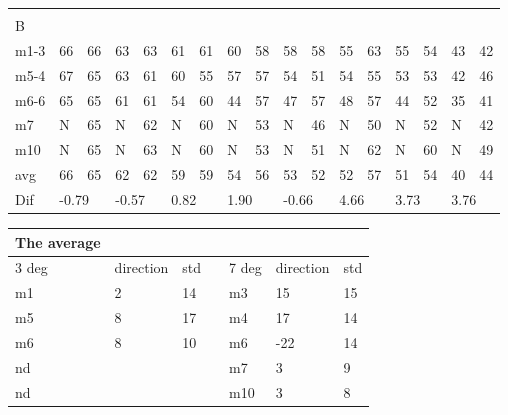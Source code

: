 \begin{table}[H]
\begin{tabular}{l|l|l|l|l|l|l|l|l|l|l|l|l|l|l|l|l}
\multicolumn{17}{l}{ } \\   
B & \multicolumn{2}{l|}{} & \multicolumn{2}{l|}{} & \multicolumn{2}{l|}{} & \multicolumn{2}{l|}{} & \multicolumn{2}{l|}{} & \multicolumn{2}{l|}{}& \multicolumn{2}{l|}{}& \multicolumn{2}{l}{}     \\ \hline
m1-3   &    66    &    66    &   63    &   63       &    61   &   61    &   60     &   58     &    58   &    58     &    55   &     63     &      55   &    54    &  43 &  42  \\
m5-4   &    67    &    65    &   63    &  61        &    60   &  55     &   57     &    57    &  54     &     51    &   54    &     55     &     53    &    53    &  42 &  46  \\
m6-6   &   65     &   65     &   61    &  61        &   54    &   60    &    44    &    57    &   47    &     57    &     48  &    57      &     44    &   52     &  35 &  41  \\
m7      &   N       &      65  &    N    &     62     &    N     &   60    &   N      &    53    &   N     &      46   &   N      &      50    &     N     &     52   &   N  &   42 \\
m10    &   N       &    65    &    N    &     63     &    N     &   60    &   N      &    53    &   N     &     51    &     N    &     62     &     N     &     60   &    N  &  49  \\ \hline
avg     &     66    &     65   &    62   &     62     &     59  &   59    &   54     &   56     &     53  &  52       &     52   &    57     &       51  &   54     & 40   & 44\\ \hline
Dif & \multicolumn{2}{l|}{-0.79} & \multicolumn{2}{l|}{-0.57} & \multicolumn{2}{l|}{0.82} & \multicolumn{2}{l|}{1.90} & \multicolumn{2}{l|}{-0.66} & \multicolumn{2}{l|}{4.66}& \multicolumn{2}{l|}{3.73}& \multicolumn{2}{l}{3.76}       
\end{tabular}
\label{ta:meas:approved_data_par}
\end{table}


\begin{table}[]
\begin{tabular}{l|l|l|l|l|l|l}
The average &           &     &  &       &           &     \\ \hline
3 deg       & direction & std &  & 7 deg & direction & std \\ \hline
m1          & 2         & 14  &  & m3    & 15        & 15  \\
m5          & 8         & 17  &  & m4    & 17        & 14  \\
m6          & 8         & 10  &  & m6    & -22       & 14  \\
nd          &           &     &  & m7    & 3         & 9   \\
nd          &           &     &  & m10   & 3         & 8  
\end{tabular}
\end{table}